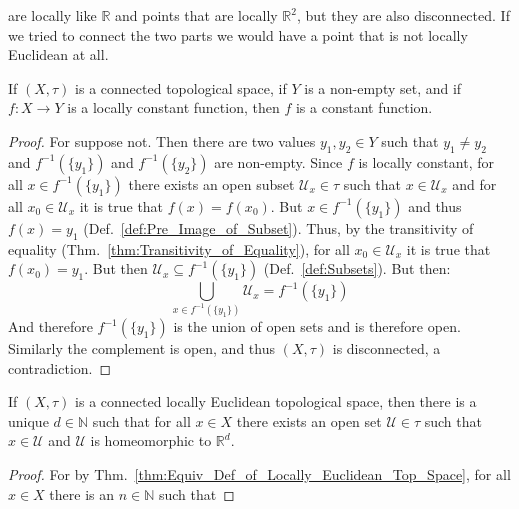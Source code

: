     are locally like $\mathbb{R}$ and points that are locally $\mathbb{R}^{2}$,
    but they are also disconnected. If we tried to connect the two parts we
    would have a point that is not locally Euclidean at all.
    \begin{theorem}
        \label{thm:Equiv_Def_of_Locally_Euclidean_Top_Space}%
        If $(X,\tau)$ is a connected topological space, if $Y$ is a non-empty
        set, and if $f:X\rightarrow{Y}$ is a locally constant function, then
        $f$ is a constant function.
    \end{theorem}
    \begin{proof}
        For suppose not. Then there are two values $y_{1},y_{2}\in{Y}$ such that
        $y_{1}\ne{y_{2}}$ and $f^{\minus{1}}(\{y_{1}\})$ and
        $f^{\minus{1}}(\{y_{2}\})$ are non-empty. Since $f$ is locally constant,
        for all $x\in{f}^{\minus{1}}(\{y_{1}\})$ there exists an open subset
        $\mathcal{U}_{x}\in\tau$ such that $x\in\mathcal{U}_{x}$ and for all
        $x_{0}\in\mathcal{U}_{x}$ it is true that $f(x)=f(x_{0})$. But
        $x\in{f}^{\minus{1}}(\{y_{1}\})$ and thus $f(x)=y_{1}$
        (Def.~\ref{def:Pre_Image_of_Subset}). Thus, by the transitivity of
        equality (Thm.~\ref{thm:Transitivity_of_Equality}), for all
        $x_{0}\in\mathcal{U}_{x}$ it is true that $f(x_{0})=y_{1}$. But then
        $\mathcal{U}_{x}\subseteq{f}^{\minus{1}}(\{y_{1}\})$
        (Def.~\ref{def:Subsets}). But then:
        \begin{equation}
            \bigcup_{x\in{f}^{\minus{1}}(\{y_{1}\})}\mathcal{U}_{x}
            =f^{\minus{1}}(\{y_{1}\})
        \end{equation}
        And therefore $f^{\minus{1}}(\{y_{1}\})$ is the union of open sets and
        is therefore open. Similarly the complement is open, and thus
        $(X,\tau)$ is disconnected, a contradiction.
    \end{proof}
    \begin{theorem}
        If $(X,\tau)$ is a connected locally Euclidean topological space, then
        there is a unique $d\in\mathbb{N}$ such that for all $x\in{X}$ there
        exists an open set $\mathcal{U}\in\tau$ such that $x\in\mathcal{U}$ and
        $\mathcal{U}$ is homeomorphic to $\mathbb{R}^{d}$.
    \end{theorem}
    \begin{proof}
        For by Thm.~\ref{thm:Equiv_Def_of_Locally_Euclidean_Top_Space}, for all
        $x\in{X}$ there is an $n\in\mathbb{N}$ such that
    \end{proof}
